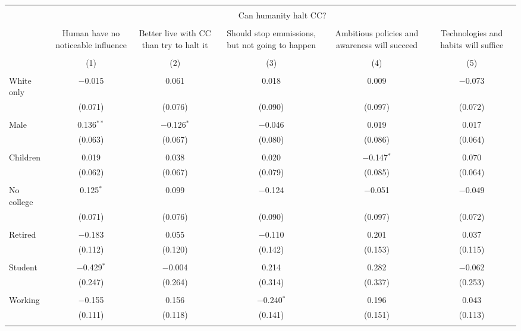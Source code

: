 
\begin{tabular}{@{\extracolsep{5pt}}lccccc} 
\\[-1.8ex]\hline 
\hline \\[-1.8ex] 
 & \multicolumn{5}{c}{Can humanity halt CC?} \\ 
\cline{2-6} 
\\[-1.8ex] & Human have no noticeable influence & Better live with CC than try to halt it & Should stop emmissions, but not going to happen & Ambitious policies and awareness will succeed & Technologies and habits will suffice \\ 
\\[-1.8ex] & (1) & (2) & (3) & (4) & (5)\\ 
\hline \\[-1.8ex] 
 White only & $-$0.015 & 0.061 & 0.018 & 0.009 & $-$0.073 \\ 
  & (0.071) & (0.076) & (0.090) & (0.097) & (0.072) \\ 
  & & & & & \\ 
 Male & 0.136$^{**}$ & $-$0.126$^{*}$ & $-$0.046 & 0.019 & 0.017 \\ 
  & (0.063) & (0.067) & (0.080) & (0.086) & (0.064) \\ 
  & & & & & \\ 
 Children & 0.019 & 0.038 & 0.020 & $-$0.147$^{*}$ & 0.070 \\ 
  & (0.062) & (0.067) & (0.079) & (0.085) & (0.064) \\ 
  & & & & & \\ 
 No college & 0.125$^{*}$ & 0.099 & $-$0.124 & $-$0.051 & $-$0.049 \\ 
  & (0.071) & (0.076) & (0.090) & (0.097) & (0.072) \\ 
  & & & & & \\ 
 Retired & $-$0.183 & 0.055 & $-$0.110 & 0.201 & 0.037 \\ 
  & (0.112) & (0.120) & (0.142) & (0.153) & (0.115) \\ 
  & & & & & \\ 
 Student & $-$0.429$^{*}$ & $-$0.004 & 0.214 & 0.282 & $-$0.062 \\ 
  & (0.247) & (0.264) & (0.314) & (0.337) & (0.253) \\ 
  & & & & & \\ 
 Working & $-$0.155 & 0.156 & $-$0.240$^{*}$ & 0.196 & 0.043 \\ 
  & (0.111) & (0.118) & (0.141) & (0.151) & (0.113) \\ 
  & & & & & \\ 

\end{tabular}
